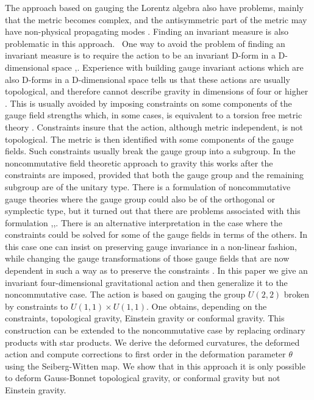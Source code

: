 \documentclass[a4paper,a4paper]{article}
\begin{document}
The approach based on gauging the Lorentz algebra also have problems, mainly
that the metric becomes complex, and the antisymmetric part of the metric may
have non-physical propagating modes \cite{complex}. Finding an invariant
measure is also problematic in this approach. \ One way to avoid the problem
of finding an invariant measure is to require the action to be an invariant
D-form in a D-dimensional space \cite{cho},\cite{CW}. Experience with building
gauge invariant actions which are also D-forms in a D-dimensional space tells
us that these actions are usually topological, and therefore cannot describe
gravity in dimensions of four or higher \cite{topology}. This is usually
avoided by imposing constraints on some components of the gauge field
strengths which, in some cases, is equivalent to a torsion free metric theory
\cite{van}. Constraints insure that the action, although metric independent,
is not topological. The metric is then identified with some components of the
gauge fields. Such constraints usually break the gauge group into a subgroup.
In the noncommutative field theoretic approach to gravity this works after the
constraints are imposed, provided that both the gauge group and the remaining
subgroup are of the unitary type. There is a formulation of noncommutative
gauge theories where the gauge group could also be of the orthogonal or
symplectic type, but it turned out that there are problems associated with
this formulation \cite{sheik},\cite{wess},\cite{deformed}. There is an
alternative interpretation in the case where the constraints could be solved
for some of the gauge fields in terms of the others. In this case one can
insist on preserving gauge invariance in a non-linear fashion, while changing
the gauge transformations of those gauge fields that are now dependent in such
a way as to preserve the constraints \cite{van}. In this paper we give an
invariant four-dimensional gravitational action and then generalize it to the
noncommutative case. The action is based on gauging the group $U(2,2)$ broken
by constraints to $U(1,1)\times U(1,1).$ One obtains, depending on the
constraints, topological gravity, Einstein gravity or conformal gravity. This
construction can be extended to the noncommutative case by replacing ordinary
products with star products. We derive the deformed curvatures, the deformed
action and compute corrections to first order in the deformation parameter
$\theta$ using the Seiberg-Witten map. We show that in this approach it is
only possible to deform Gauss-Bonnet topological gravity, or conformal gravity
but not Einstein gravity.
\end{document}
